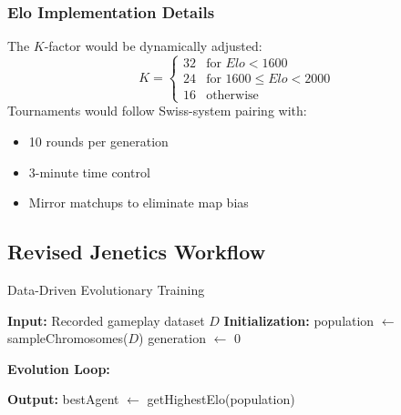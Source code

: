 \documentclass[sigconf]{acmart} %
\begin{document}
\subsubsection{Elo Implementation Details}
The $K$-factor would be dynamically adjusted:
\begin{equation}
	K = \begin{cases} 
		32 & \text{for } Elo < 1600 \\
		24 & \text{for } 1600 \leq Elo < 2000 \\
		16 & \text{otherwise}
	\end{cases}
\end{equation}
Tournaments would follow Swiss-system pairing with:
\begin{itemize}
	\item 10 rounds per generation
	\item 3-minute time control
	\item Mirror matchups to eliminate map bias
\end{itemize}

\subsection{Revised Jenetics Workflow}
\begin{algorithm}[t]
	\caption{Data-Driven Evolutionary Training}
	\label{alg:jenetics_workflow}
	\DontPrintSemicolon
	
	\textbf{Input:} Recorded gameplay dataset $D$\;
	\nl\textbf{Initialization:} 
	population $\leftarrow$ sampleChromosomes($D$)\;
	generation $\leftarrow$ 0\;
	
	\BlankLine
	\nl\textbf{Evolution Loop:}\;
	\nl {}
	
	\nl\textbf{Output:} 
	bestAgent $\leftarrow$ getHighestElo(population)\;
\end{algorithm}
\end{document}
